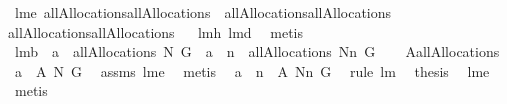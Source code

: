 \begin{isabellebody}
%
\endisatagproof
{\isafoldproof}%
%
\isadelimproof
%
\endisadelimproof
\isanewline
\isanewline
{}\isamarkupfalse%
\ lm{}{}e{\isacharcolon}\ {\isachardoublequoteopen}allAllocations{\isacharprime}{\isacharequal}allAllocations{\isacharprime}{\isacharprime}\ {\isacharampersand}\ allAllocations{\isacharprime}{\isacharprime}{\isacharequal}allAllocations{\isacharprime}{\isacharprime}{\isacharprime}\ {\isacharampersand}\isanewline
allAllocations{\isacharprime}{\isacharprime}{\isacharprime}{\isacharequal}allAllocations{\isacharprime}{\isacharprime}{\isacharprime}{\isacharprime}{\isachardoublequoteclose}%
\isadelimproof
\ %
\endisadelimproof
%
\isatagproof
{}\isamarkupfalse%
\ lm{}{}h\ lm{}{}d\ \isamarkupfalse%
\ metis%
\endisatagproof
{\isafoldproof}%
%
\isadelimproof
%
\endisadelimproof
\isanewline
\isanewline
{}\isamarkupfalse%
\ lm{}{}b{\isacharcolon}\ \ {\isachardoublequoteopen}a\ {\isasymin}\ allAllocations{\isacharprime}\ N\ G{\isachardoublequoteclose}\ \ {\isachardoublequoteopen}a\ {\isacharminus}{\isacharminus}\ n\ {\isasymin}\ allAllocations{\isacharprime}\ {\isacharparenleft}N{\isacharminus}{\isacharbraceleft}n{\isacharbraceright}{\isacharparenright}\ G{\isachardoublequoteclose}\isanewline
%
\isadelimproof
\isanewline
%
\endisadelimproof
%
\isatagproof
{}\isamarkupfalse%
\ {\isacharminus}\ \isanewline
{}\isamarkupfalse%
\ {\isacharquery}A{\isacharprime}{\isacharequal}allAllocations{\isacharprime}{\isacharprime}{\isacharprime}{\isacharprime}\ \isamarkupfalse%
\ {\isachardoublequoteopen}a\ {\isasymin}\ {\isacharquery}A{\isacharprime}\ N\ G{\isachardoublequoteclose}\ \isamarkupfalse%
\ assms\ lm{}{}e\ \isamarkupfalse%
\ metis\ \isamarkupfalse%
\isanewline
{}\isamarkupfalse%
\ {\isachardoublequoteopen}a\ {\isacharminus}{\isacharminus}\ n\ {\isasymin}\ {\isacharquery}A{\isacharprime}\ {\isacharparenleft}N{\isacharminus}{\isacharbraceleft}n{\isacharbraceright}{\isacharparenright}\ G{\isachardoublequoteclose}\ \isamarkupfalse%
\ {\isacharparenleft}rule\ lm{}{}{\isacharparenright}\ \isamarkupfalse%
\ {\isacharquery}thesis\ \isamarkupfalse%
\ lm{}{}e\ \isamarkupfalse%
\ metis\ \isanewline
{}\isamarkupfalse%

\end{isabellebody}
